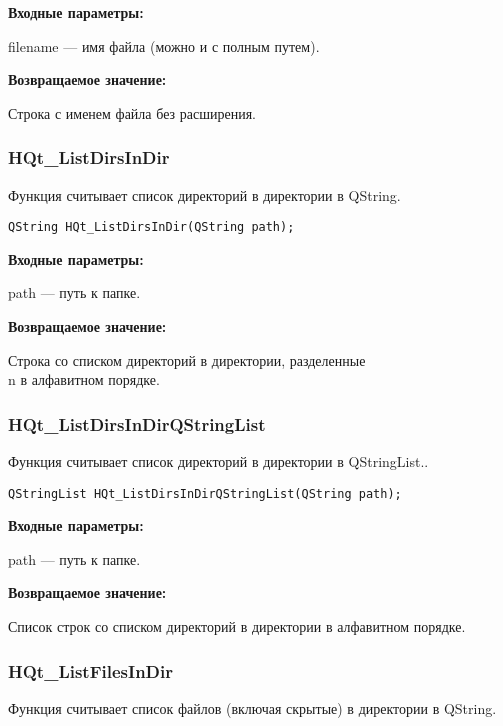 \documentclass[a4paper,12pt]{article}
\begin{document}
\textbf{Входные параметры:}

filename --- имя файла (можно и с полным путем).

\textbf{Возвращаемое значение:}

Строка с именем файла без расширения.


\subsubsection{HQt\_ListDirsInDir}\label{HQt_ListDirsInDir}

Функция считывает список директорий в директории в QString.


\begin{lstlisting}[label=code_syntax_HQt_ListDirsInDir,caption=Синтаксис]
QString HQt_ListDirsInDir(QString path);
\end{lstlisting}

\textbf{Входные параметры:}

path --- путь к папке.

\textbf{Возвращаемое значение:}

 Строка со списком директорий в директории, разделенные \\n в алфавитном порядке.


\subsubsection{HQt\_ListDirsInDirQStringList}\label{HQt_ListDirsInDirQStringList}

Функция считывает список директорий в директории в QStringList..


\begin{lstlisting}[label=code_syntax_HQt_ListDirsInDirQStringList,caption=Синтаксис]
QStringList HQt_ListDirsInDirQStringList(QString path);
\end{lstlisting}

\textbf{Входные параметры:}

path --- путь к папке.

\textbf{Возвращаемое значение:}

Список строк со списком директорий в директории в алфавитном порядке.


\subsubsection{HQt\_ListFilesInDir}\label{HQt_ListFilesInDir}

Функция считывает список файлов (включая скрытые) в директории в QString.
\end{document}
